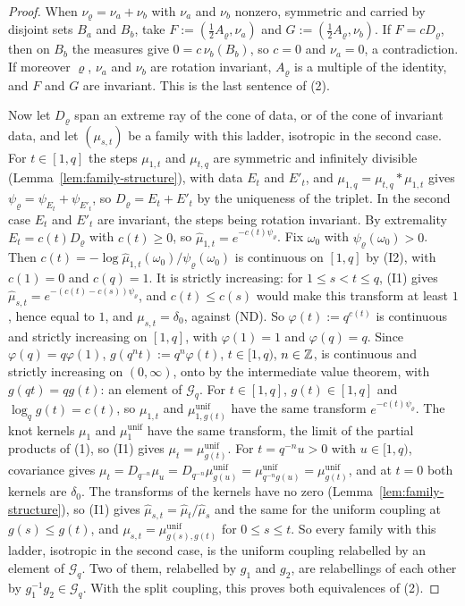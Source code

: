 \begin{proof}
When $\nu_\varrho = \nu_a + \nu_b$ with $\nu_a$ and $\nu_b$ nonzero, symmetric and carried by
disjoint sets $B_a$ and $B_b$, take $F := (\tfrac12A_\varrho, \nu_a)$ and
$G := (\tfrac12A_\varrho, \nu_b)$. If $F = cD_\varrho$, then on $B_b$ the measures give
$0 = c\,\nu_b(B_b)$, so $c = 0$ and $\nu_a = 0$, a contradiction. If moreover $\varrho$, $\nu_a$ and
$\nu_b$ are rotation invariant, $A_\varrho$ is a multiple of the identity, and $F$ and $G$ are
invariant. This is the last sentence of (2).

Now let $D_\varrho$ span an extreme ray of the cone of data, or of the cone of invariant data, and let
$(\mu_{s,t})$ be a family with this ladder, isotropic in the second case. For $t \in [1, q]$ the
steps $\mu_{1,t}$ and $\mu_{t,q}$ are symmetric and infinitely divisible
(Lemma~\ref{lem:family-structure}), with data $E_t$ and $E'_t$, and
$\mu_{1,q} = \mu_{t,q} * \mu_{1,t}$ gives $\psi_\varrho = \psi_{E_t} + \psi_{E'_t}$, so
$D_\varrho = E_t + E'_t$ by the uniqueness of the triplet. In the second case $E_t$ and $E'_t$ are
invariant, the steps being rotation invariant. By extremality $E_t = c(t)D_\varrho$ with
$c(t) \ge 0$, so $\widehat\mu_{1,t} = e^{-c(t)\psi_\varrho}$. Fix $\omega_0$ with
$\psi_\varrho(\omega_0) > 0$. Then $c(t) = -\log\widehat\mu_{1,t}(\omega_0)/\psi_\varrho(\omega_0)$
is continuous on $[1, q]$ by (I2), with $c(1) = 0$ and $c(q) = 1$. It is strictly increasing: for
$1 \le s < t \le q$, (I1) gives $\widehat\mu_{s,t} = e^{-(c(t) - c(s))\psi_\varrho}$, and
$c(t) \le c(s)$ would make this transform at least $1$, hence equal to $1$, and
$\mu_{s,t} = \delta_0$, against (ND). So $\varphi(t) := q^{c(t)}$ is continuous and strictly
increasing on $[1, q]$, with $\varphi(1) = 1$ and $\varphi(q) = q$. Since $\varphi(q) = q\varphi(1)$,
$g(q^nt) := q^n\varphi(t)$, $t \in [1, q)$, $n \in \mathbb{Z}$, is continuous and strictly increasing
on $(0, \infty)$, onto by the intermediate value theorem, with $g(qt) = qg(t)$: an element of
$\mathcal{G}_q$. For $t \in [1, q]$,
$g(t) \in [1, q]$ and $\log_qg(t) = c(t)$, so $\mu_{1,t}$ and $\mu^{\mathrm{unif}}_{1,g(t)}$ have the
same transform $e^{-c(t)\psi_\varrho}$. The knot kernels $\mu_1$ and $\mu^{\mathrm{unif}}_1$ have the
same transform, the limit of the partial products of (1), so (I1) gives
$\mu_t = \mu^{\mathrm{unif}}_{g(t)}$. For $t = q^{-n}u > 0$ with $u \in [1, q)$, covariance gives
$\mu_t = D_{q^{-n}}\mu_u = D_{q^{-n}}\mu^{\mathrm{unif}}_{g(u)} = \mu^{\mathrm{unif}}_{q^{-n}g(u)}
= \mu^{\mathrm{unif}}_{g(t)}$, and at $t = 0$ both kernels are $\delta_0$. The transforms of the
kernels have no zero (Lemma~\ref{lem:family-structure}), so (I1) gives
$\widehat\mu_{s,t} = \widehat\mu_t/\widehat\mu_s$ and the same for the uniform coupling at
$g(s) \le g(t)$, and $\mu_{s,t} = \mu^{\mathrm{unif}}_{g(s),g(t)}$ for $0 \le s \le t$. So every
family with this ladder, isotropic in the second case, is the uniform coupling relabelled by an
element of $\mathcal{G}_q$. Two of them, relabelled by $g_1$ and $g_2$, are relabellings of each
other by $g_1^{-1}g_2 \in \mathcal{G}_q$. With the split coupling, this proves both equivalences of
(2).


\end{proof}
